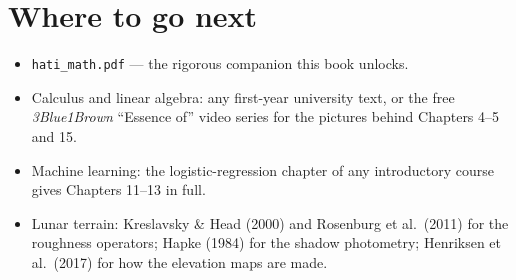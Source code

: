 \documentclass[11pt,oneside]{book}
\begin{document}
\chapter{Where to go next}
\begin{itemize}[leftmargin=1.4em]
\item \texttt{hati\_math.pdf} --- the rigorous companion this book unlocks.
\item Calculus and linear algebra: any first-year university text, or the free
\emph{3Blue1Brown} ``Essence of'' video series for the pictures behind Chapters 4--5
and 15.
\item Machine learning: the logistic-regression chapter of any introductory course
gives Chapters 11--13 in full.
\item Lunar terrain: Kreslavsky \& Head (2000) and Rosenburg et al.\ (2011) for the
roughness operators; Hapke (1984) for the shadow photometry; Henriksen et al.\ (2017)
for how the elevation maps are made.
\end{itemize}
\end{document}
